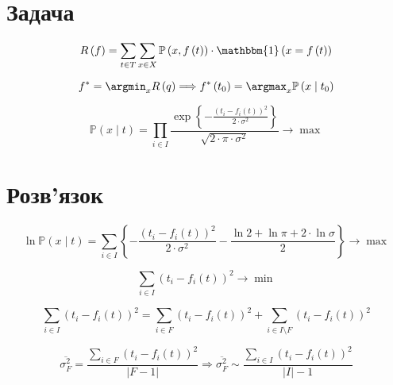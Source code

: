 \section{Задача}

\begin{equation*}
  R \left( f \right)
  = \sum\limits_{t \in T} \sum\limits_{x \in X}
    \mathbb{P} \left( x,  f\left( t \right) \right)
    \cdot \mathbbm{1} \left( x = f\left( t \right) \right)
\end{equation*}

\begin{equation*}
  f^*
  = \argmin_x R \left( q \right)
  \Longrightarrow
  f^* \left( t_0 \right)
  = \argmax_x \mathbb{P} \left( x \mid  t_0 \right)
\end{equation*}

\begin{equation*}
  \mathbb{P}\left( x \mid t \right)
  = \prod_{i \in I}
    \frac{\exp{\left\{- \frac{\left( t_i - f_i\left( t \right) \right)^2}
         {2 \cdot \sigma^2} \right\}}}{\sqrt{2 \cdot \pi \cdot \sigma^2}}
  \to \max
\end{equation*}

\section{Розв'язок}

\begin{equation*}
  \ln{\mathbb{P}\left( x \mid t \right)}
  = \sum_{i \in I}
    \left\{
      - \frac{\left( t_i - f_i\left( t \right) \right)^2}{2 \cdot \sigma^2}
      - \frac{\ln{2} + \ln{\pi} + 2 \cdot \ln{\sigma}}{2}
    \right\}
  \to \max
\end{equation*}

\begin{equation*}
  \sum_{i \in I} \left( t_i - f_i\left( t \right) \right)^2 \to \min
\end{equation*}

\begin{equation*}
  \sum_{i \in I} \left( t_i - f_i\left( t \right) \right)^2
  = \sum_{i \in F} \left( t_i - f_i\left( t \right) \right)^2
  + \sum_{i \in I \setminus F} \left( t_i - f_i\left( t \right) \right)^2
\end{equation*}

\begin{equation*}
    \overline{\sigma_F^2}
    = \frac{\sum\limits_{i \in F} \left( t_i - f_i\left( t \right) \right)^2}
           {\left| F - 1 \right|}
    \Rightarrow
    \overline{\sigma_F^2}
    \sim \frac{\sum\limits_{i \in I}
                 \left( t_i - f_i\left( t \right) \right)^2}
               {\left| I \right| - 1}
\end{equation*}

